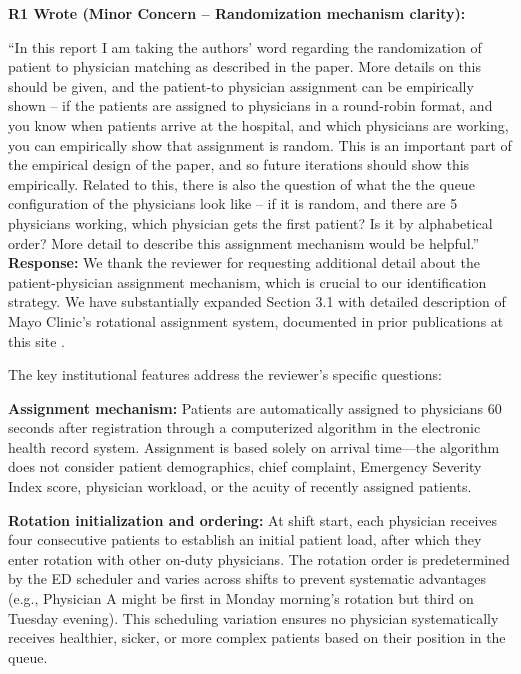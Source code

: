 \documentclass[11pt]{article}
\newenvironment{quote2}
{ \bigskip
\noindent
         \small\em
         \baselineskip=14pt
}
\newcommand{\1}{\hbox{\rm 1\kern-.35em 1}}
\begin{document}
{%
\begin{quote2}
\textbf{R1 Wrote (Minor Concern – Randomization mechanism clarity):}  

\noindent``In this report I am taking the authors’ word regarding the randomization of patient to physician matching as described in the paper. More details on this should be given, and the patient-to physician assignment can be empirically shown – if the patients are assigned to physicians in a round-robin format, and you know when patients arrive at the hospital, and which physicians are working, you can empirically show that assignment is random. This is an important part of the empirical design of the paper, and so future iterations should show this empirically. Related to this, there is also the question of what the the queue configuration of the physicians look like – if it is random, and there are 5 physicians working, which physician gets the first patient? Is it by alphabetical order? More detail to describe this assignment mechanism would be helpful.” 
\end{quote2}

\noindent\textbf{Response:} \color{blue}We thank the reviewer for requesting additional detail about the patient-physician assignment mechanism, which is crucial to our identification strategy. We have substantially expanded Section 3.1 with detailed description of Mayo Clinic's rotational assignment system, documented in prior publications at this site \cite{Traub2016, traub2016emergency, Traub2018}. 

The key institutional features address the reviewer's specific questions:

\textbf{Assignment mechanism:} Patients are automatically assigned to physicians 60 seconds after registration through a computerized algorithm in the electronic health record system. Assignment is based solely on arrival time—the algorithm does not consider patient demographics, chief complaint, Emergency Severity Index score, physician workload, or the acuity of recently assigned patients.

\textbf{Rotation initialization and ordering:} At shift start, each physician receives four consecutive patients to establish an initial patient load, after which they enter rotation with other on-duty physicians. The rotation order is predetermined by the ED scheduler and varies across shifts to prevent systematic advantages (e.g., Physician A might be first in Monday morning's rotation but third on Tuesday evening). This scheduling variation ensures no physician systematically receives healthier, sicker, or more complex patients based on their position in the queue.

}
\end{document}
